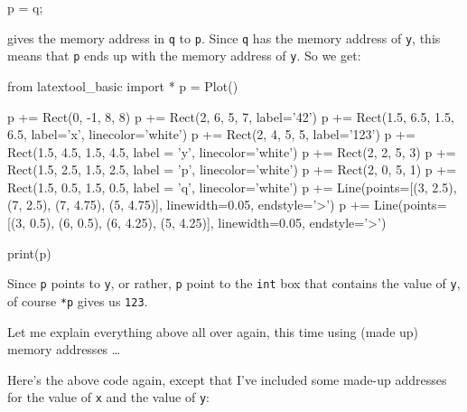 \begin{consolethree}[escapeinside=||]
p = q;
\end{consolethree}

gives the memory address in \texttt{q} to \texttt{p}. Since \texttt{q} has the memory address of \texttt{y}, this means that \texttt{p} ends up with the memory address of \texttt{y}. So we get:

\begin{python}
from latextool_basic import *
p = Plot()

p += Rect(0, -1, 8, 8)
p += Rect(2, 6, 5, 7, label='42')
p += Rect(1.5, 6.5, 1.5, 6.5, label='x', linecolor='white')
p += Rect(2, 4, 5, 5, label='123')
p += Rect(1.5, 4.5, 1.5, 4.5, label = 'y', linecolor='white')
p += Rect(2, 2, 5, 3)
p += Rect(1.5, 2.5, 1.5, 2.5, label = 'p', linecolor='white')
p += Rect(2, 0, 5, 1)
p += Rect(1.5, 0.5, 1.5, 0.5, label = 'q', linecolor='white')
p += Line(points=[(3, 2.5), (7, 2.5), (7, 4.75), (5, 4.75)], linewidth=0.05, endstyle='>')
p += Line(points=[(3, 0.5), (6, 0.5), (6, 4.25), (5, 4.25)], linewidth=0.05, endstyle='>')

print(p)
\end{python}

Since \texttt{p} points to \texttt{y}, or rather, \texttt{p} point to the \texttt{int} box that contains the value of \texttt{y}, of course \texttt{*p} gives us \texttt{123}.

Let me explain everything above all over again, this time using (made up) memory addresses \ldots{} 

Here's the above code again, except that I've included some made-up addresses for the value of \texttt{x} and the value of \texttt{y}:

